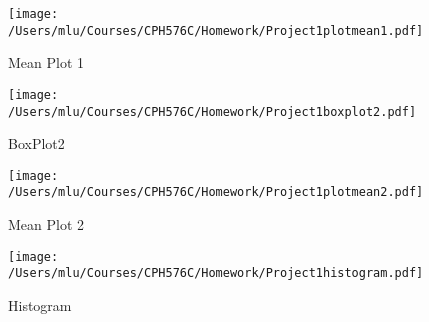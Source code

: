 \documentclass{article}
\begin{document}
     
   \begin{figure}[htb]
     \begin{center}
     \texttt{[image: /Users/mlu/Courses/CPH576C/Homework/Project1plotmean1.pdf]}
     \caption{Mean Plot 1}
     \end{center}
     \end{figure}  
     
     
\begin{figure}[htb]
     \begin{center}
     \texttt{[image: /Users/mlu/Courses/CPH576C/Homework/Project1boxplot2.pdf]}
     \caption{BoxPlot2 }
     \end{center}
     \end{figure}


\begin{figure}[htb]
     \begin{center}
     \texttt{[image: /Users/mlu/Courses/CPH576C/Homework/Project1plotmean2.pdf]}
     \caption{Mean Plot 2}
     \end{center}
     \end{figure}
     
\begin{figure}[htb]
  \begin{center}
    \texttt{[image: /Users/mlu/Courses/CPH576C/Homework/Project1histogram.pdf]}
    \caption{Histogram}
    \end{center}
    \end{figure}

              
 
\end{document}
